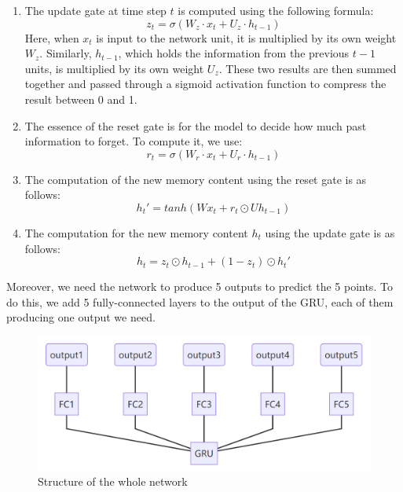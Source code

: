 \begin{enumerate}
    \item 
    The update gate at time step $t$ is computed using the following formula:  
    $$  z_t = \sigma(W_z \cdot x_t + U_z \cdot h_{t-1})  $$  
    Here, when $x_t$ is input to the network unit, 
    it is multiplied by its own weight $W_z$. 
    Similarly, $h_{t-1}$, which holds the information from the previous $t-1$ units, 
    is multiplied by its own weight $U_z$. These two results are then summed together 
    and passed through a sigmoid activation function to compress the result between 0 and 1. 
  
    \item 
    The essence of the reset gate is for the model to decide how much past information to forget. To compute it, we use:  
    $$  r_t = \sigma(W_r \cdot x_t + U_r \cdot h_{t-1})  $$  

    \item 
    The computation of the new memory content using the reset gate is as follows:  
    $$ h_t'= tanh(Wx_t+r_t\odot Uh_{t-1})$$

    \item 
    The computation for the new memory content $h_t$ using the update gate is as follows:  
    $$ h_t=z_t\odot h_{t-1}+(1-z_t)\odot h_t'$$ 
\end{enumerate}

Moreover, we need the network to produce 5 outputs to predict the 5 points. To do this, we add 5 fully-connected layers to the output of the GRU, each of them producing one output we need.

\begin{figure}[H]
    \centering
    \includegraphics[scale=0.7]{mainmatter/imgs/10.png}
    \caption{Structure of the whole network}
\end{figure}


